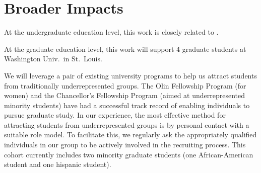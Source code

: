 \section{Broader Impacts}
\label{sec:broader}


At the undergraduate education level, this work is closely related to
.

At the graduate education level, this work will support 4 graduate
students at Washington Univ.~in St.~Louis.

We will leverage a pair of existing university programs to help us
attract students from traditionally underrepresented groups.  The Olin
Fellowship Program (for women) and the Chancellor's Fellowship Program
(aimed at underrepresented minority students) have had a successful track
record of enabling individuals to pursue graduate study.  In our
experience, the most effective method for attracting students from
underrepresented groups is by personal contact with a suitable role
model.  To facilitate this, we regularly ask the appropriately
qualified individuals in our group to be actively involved in the
recruiting process.  This cohort currently includes two
minority graduate students (one African-American student and one hispanic 
student). 

